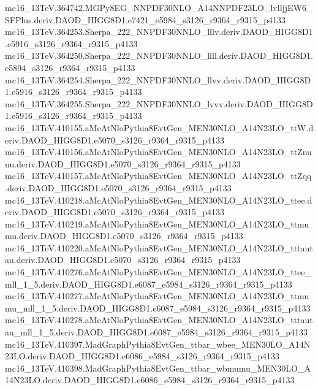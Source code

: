 \begin{scriptsize}
mc16\_13TeV.364742.MGPy8EG\_NNPDF30NLO\_A14NNPDF23LO\_lvlljjEW6\_SFPlus.deriv.DAOD\_HIGG8D1.e7421\_e5984\_s3126\_r9364\_r9315\_p4133 \\
mc16\_13TeV.364253.Sherpa\_222\_NNPDF30NNLO\_lllv.deriv.DAOD\_HIGG8D1.e5916\_s3126\_r9364\_r9315\_p4133 \\
mc16\_13TeV.364250.Sherpa\_222\_NNPDF30NNLO\_llll.deriv.DAOD\_HIGG8D1.e5894\_s3126\_r9364\_r9315\_p4133 \\
mc16\_13TeV.364254.Sherpa\_222\_NNPDF30NNLO\_llvv.deriv.DAOD\_HIGG8D1.e5916\_s3126\_r9364\_r9315\_p4133 \\
mc16\_13TeV.364255.Sherpa\_222\_NNPDF30NNLO\_lvvv.deriv.DAOD\_HIGG8D1.e5916\_s3126\_r9364\_r9315\_p4133 \\
mc16\_13TeV.410155.aMcAtNloPythia8EvtGen\_MEN30NLO\_A14N23LO\_ttW.deriv.DAOD\_HIGG8D1.e5070\_s3126\_r9364\_r9315\_p4133 \\
mc16\_13TeV.410156.aMcAtNloPythia8EvtGen\_MEN30NLO\_A14N23LO\_ttZnunu.deriv.DAOD\_HIGG8D1.e5070\_s3126\_r9364\_r9315\_p4133 \\
mc16\_13TeV.410157.aMcAtNloPythia8EvtGen\_MEN30NLO\_A14N23LO\_ttZqq.deriv.DAOD\_HIGG8D1.e5070\_s3126\_r9364\_r9315\_p4133 \\
mc16\_13TeV.410218.aMcAtNloPythia8EvtGen\_MEN30NLO\_A14N23LO\_ttee.deriv.DAOD\_HIGG8D1.e5070\_s3126\_r9364\_r9315\_p4133 \\
mc16\_13TeV.410219.aMcAtNloPythia8EvtGen\_MEN30NLO\_A14N23LO\_ttmumu.deriv.DAOD\_HIGG8D1.e5070\_s3126\_r9364\_r9315\_p4133 \\
mc16\_13TeV.410220.aMcAtNloPythia8EvtGen\_MEN30NLO\_A14N23LO\_tttautau.deriv.DAOD\_HIGG8D1.e5070\_s3126\_r9364\_r9315\_p4133 \\
mc16\_13TeV.410276.aMcAtNloPythia8EvtGen\_MEN30NLO\_A14N23LO\_ttee\_mll\_1\_5.deriv.DAOD\_HIGG8D1.e6087\_e5984\_s3126\_r9364\_r9315\_p4133 \\
mc16\_13TeV.410277.aMcAtNloPythia8EvtGen\_MEN30NLO\_A14N23LO\_ttmumu\_mll\_1\_5.deriv.DAOD\_HIGG8D1.e6087\_e5984\_s3126\_r9364\_r9315\_p4133 \\
mc16\_13TeV.410278.aMcAtNloPythia8EvtGen\_MEN30NLO\_A14N23LO\_tttautau\_mll\_1\_5.deriv.DAOD\_HIGG8D1.e6087\_e5984\_s3126\_r9364\_r9315\_p4133 \\
mc16\_13TeV.410397.MadGraphPythia8EvtGen\_ttbar\_wbee\_MEN30LO\_A14N23LO.deriv.DAOD\_HIGG8D1.e6086\_e5984\_s3126\_r9364\_r9315\_p4133 \\
mc16\_13TeV.410398.MadGraphPythia8EvtGen\_ttbar\_wbmumu\_MEN30LO\_A14N23LO.deriv.DAOD\_HIGG8D1.e6086\_e5984\_s3126\_r9364\_r9315\_p4133 \\

\end{scriptsize}

